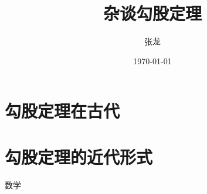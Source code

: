 \documentclass[UTF8]{ctexart}
\title{杂谈勾股定理}
\author{张龙}
\date{\today}
\begin{document}
\maketitle
\tableofcontents
\section{勾股定理在古代}
\section{勾股定理的近代形式}

数学
\end{document}
